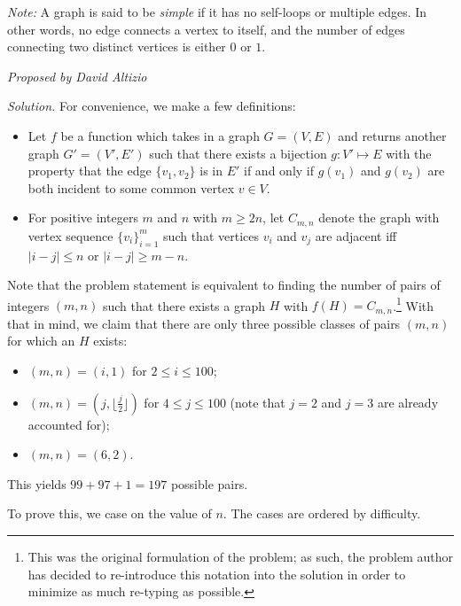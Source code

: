 \documentclass[10pt]{article}
\newcommand{\proposed}[1]
{
\vspace{5pt}
\noindent\textit{Proposed by #1}
}
\newcommand{\solution}
{
\vspace{5pt}
\noindent\textit{Solution.}\qquad
}
\begin{document}
\begin{enumerate}
\par \textit{Note: }A graph is said to be \textit{simple} if it has no self-loops or multiple edges. In other words, no edge connects a vertex to itself, and the number of edges connecting two distinct vertices is either $0$ or $1$.

\proposed{David Altizio}

\solution For convenience, we make a few definitions:

\begin{itemize}

\item Let $f$ be a function which takes in a graph $G=(V,E)$ and returns another graph $G'=(V',E')$ such that there exists a bijection $g:V'\mapsto E$ with the property that the edge $\{v_1,v_2\}$ is in $E'$ if and only if $g(v_1)$ and $g(v_2)$ are both incident to some common vertex $v\in V$.

\item For positive integers $m$ and $n$ with $m\geq2n$, let $C_{m,n}$ denote the graph with vertex sequence $\{v_i\}_{i=1}^m$ such that vertices $v_i$ and $v_j$ are adjacent iff $|i-j|\leq n$ or $|i-j|\geq m-n$.

\end{itemize} 

Note that the problem statement is equivalent to finding the number of pairs of integers $(m,n)$ such that there exists a graph $H$ with $f(H)=C_{m,n}$.\footnote{This was the original formulation of the problem; as such, the problem author has decided to re-introduce this notation into the solution in order to minimize as much re-typing as possible.} With that in mind, we claim that there are only three possible classes of pairs $(m,n)$ for which an $H$ exists:

\begin{itemize}

\item $(m,n)=(i,1)$ for $2\leq i\leq 100$;

\item $(m,n)=(j,\lfloor\tfrac j2\rfloor)$ for $4\leq j\leq 100$ (note that $j=2$ and $j=3$ are already accounted for);

\item $(m,n)=(6,2)$.

\end{itemize}

This yields $99+97+1=\boxed{197}$ possible pairs.

\par To prove this, we case on the value of $n$.  The cases are ordered by difficulty.


\end{enumerate}
\end{document}
